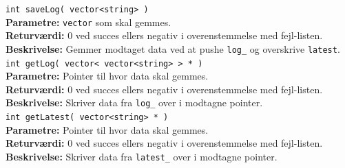 \verb+int saveLog( vector<string> ) +\\
\textbf{Parametre:} \verb+vector+ som skal gemmes. \\
\textbf{Returværdi:} 0 ved succes ellers negativ i overenstemmelse med fejl-listen. \\
\textbf{Beskrivelse:} Gemmer modtaget data ved at pushe \verb+log_+ og overskrive \verb+latest+. \\

\verb+int getLog( vector< vector<string> > * ) + \\
\textbf{Parametre:} Pointer til hvor data skal gemmes. \\
\textbf{Returværdi:} 0 ved succes ellers negativ i overenstemmelse med fejl-listen. \\
\textbf{Beskrivelse:} Skriver data fra \verb+log_+ over i modtagne pointer. \\

\verb+int getLatest( vector<string> * ) +\\
\textbf{Parametre:} Pointer til hvor data skal gemmes.  \\
\textbf{Returværdi:} 0 ved succes ellers negativ i overenstemmelse med fejl-listen. \\
\textbf{Beskrivelse:} Skriver data fra \verb+latest_+ over i modtagne pointer. \\


